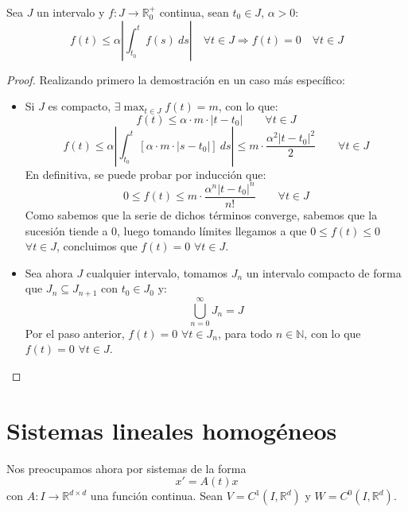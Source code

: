 \begin{lema}\label{lema:unicidad_teo}
    Sea $J$ un intervalo y $f:J\rightarrow \mathbb{R}^+_0$ continua, sean $t_0\in J$, $\alpha >0$:
    \begin{equation*}
        f(t) \leq \alpha\left|\int_{t_0}^{t} f(s)~ds \right| \quad \forall t\in J \Longrightarrow f(t) = 0 \quad \forall t\in J
    \end{equation*}
    \begin{proof}
        Realizando primero la demostración en un caso más específico:
        \begin{itemize}
            \item Si $J$ es compacto, $\exists \max_{t\in J} f(t) = m$, con lo que:
                \begin{equation*}
                    f(t) \leq \alpha \cdot m\cdot  |t-t_0| \qquad \forall t\in J
                \end{equation*}
                \begin{equation*}
                    f(t) \leq \alpha \left|\int_{t_0}^{t} [\alpha \cdot m\cdot  |s-t_0|]~ds \right| \leq m\cdot  \dfrac{\alpha^2 {|t-t_0|}^{2}}{2}\qquad \forall t\in J
                \end{equation*}
                En definitiva, se puede probar por inducción que:
                \begin{equation*}
                    0\leq f(t) \leq m\cdot  \dfrac{\alpha^n {|t-t_0|}^{n}}{n!} \qquad \forall t\in J
                \end{equation*}
                Como sabemos que la serie de dichos términos converge, sabemos que la sucesión tiende a 0, luego tomando límites llegamos a que $0\leq f(t) \leq 0$ $\forall t\in J$, concluimos que $f(t) = 0$ $\forall t\in J$.
            \item Sea ahora $J$ cualquier intervalo, tomamos $J_n$ un intervalo compacto de forma que $J_n \subseteq J_{n+1}$ con $t_0 \in J_0$ y:
                \begin{equation*}
                    \bigcup_{n=0}^\infty J_n = J
                \end{equation*}
                Por el paso anterior, $f(t) = 0$ $\forall t\in J_n$, para todo $n\in \mathbb{N}$, con lo que $f(t) = 0$ $\forall t\in J$.
        \end{itemize}
    \end{proof}
\end{lema}

\section{Sistemas lineales homogéneos}
\noindent
Nos preocupamos ahora por sistemas de la forma
\begin{equation}\label{eq:lin_sup_h}
    x' = A(t) x
\end{equation}
con $A:I\rightarrow\mathbb{R}^{d\times d}$ una función continua. Sean $V = C^1(I,\mathbb{R}^d)$ y $W=C^0(I,\mathbb{R}^d)$.

